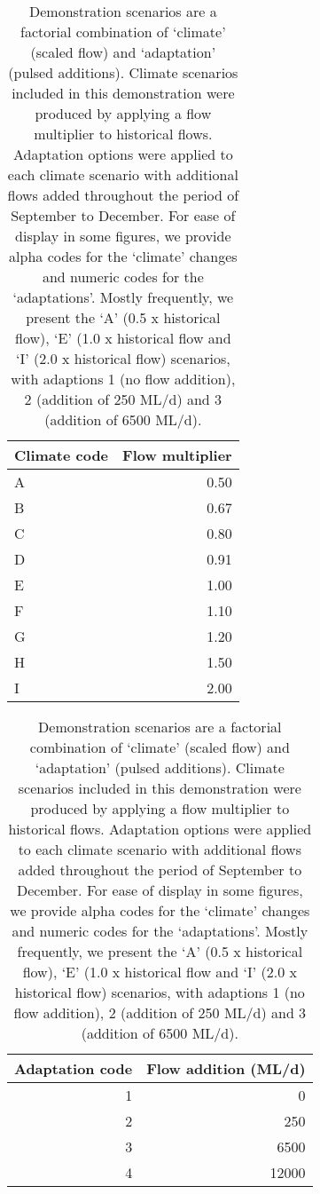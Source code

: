 \documentclass[
  number]{elsarticle}
\begin{document}
\begin{table}

\caption{\label{tbl-scenarios}Demonstration scenarios are a factorial
combination of `climate' (scaled flow) and `adaptation' (pulsed
additions). Climate scenarios included in this demonstration were
produced by applying a flow multiplier to historical flows. Adaptation
options were applied to each climate scenario with additional flows
added throughout the period of September to December. For ease of
display in some figures, we provide alpha codes for the `climate'
changes and numeric codes for the `adaptations'. Mostly frequently, we
present the `A' (0.5 x historical flow), `E' (1.0 x historical flow and
`I' (2.0 x historical flow) scenarios, with adaptions 1 (no flow
addition), 2 (addition of 250 ML/d) and 3 (addition of 6500
ML/d).}\begin{minipage}[t]{0.50\linewidth}

{\centering 

\begin{tabular}[t]{lr}
\toprule
Climate code & Flow multiplier\\
\midrule
A & 0.50\\
B & 0.67\\
C & 0.80\\
D & 0.91\\
E & 1.00\\
F & 1.10\\
G & 1.20\\
H & 1.50\\
I & 2.00\\
\bottomrule
\end{tabular}

}

\end{minipage}%
%
\begin{minipage}[t]{0.50\linewidth}

{\centering 

\begin{tabular}[t]{rr}
\toprule
Adaptation code & Flow addition (ML/d)\\
\midrule
1 & 0\\
2 & 250\\
3 & 6500\\
4 & 12000\\
\bottomrule
\end{tabular}

}

\end{minipage}%

\end{table}
\end{document}
